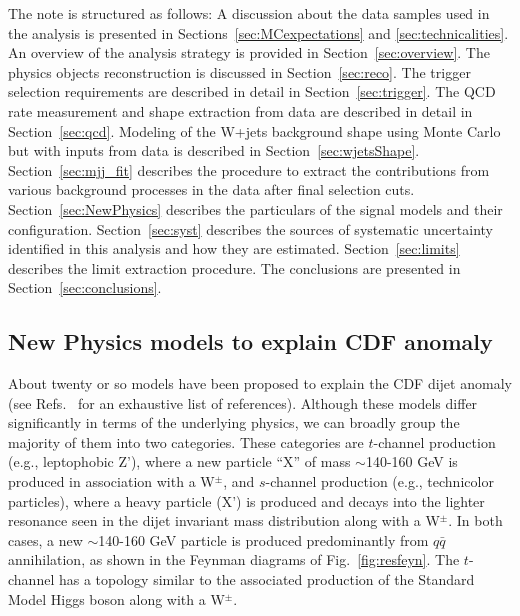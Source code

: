 \par
The note is structured as follows:
A discussion about the data samples used in the analysis is
presented in Sections~\ref{sec:MCexpectations} and \ref{sec:technicalities}.  
An overview of the analysis strategy is provided in Section~\ref{sec:overview}.
The physics objects reconstruction is discussed in Section~\ref{sec:reco}.
The trigger selection requirements are described in detail 
in Section~\ref{sec:trigger}.
The QCD rate measurement and shape extraction from data are 
described in detail in Section~\ref{sec:qcd}.
Modeling of the W+jets background shape using Monte Carlo 
but with inputs from data is described in Section~\ref{sec:wjetsShape}.
Section~\ref{sec:mjj_fit} describes the procedure to extract 
the contributions from various background processes in the data 
after final selection cuts.
Section~\ref{sec:NewPhysics} describes the particulars of the signal
models and their configuration.
Section~\ref{sec:syst} describes the sources of systematic uncertainty
identified in this analysis and how they are estimated.
Section~\ref{sec:limits} describes the limit extraction procedure.
The conclusions are presented in Section~\ref{sec:conclusions}.
\subsection{New Physics models to explain CDF anomaly}
\label{sec:models}
About twenty or so models have been proposed to  
explain the CDF dijet anomaly (see
Refs.~\cite{BuckleyHooperMartin} for an exhaustive list of references). 
Although these models differ significantly in terms of the 
underlying physics, we can broadly group the majority of them into two categories.
These categories are $t$-channel production (e.g., leptophobic Z'), 
where a new particle ``X'' of mass $\sim$140-160 GeV is produced in 
association with a W$^\pm$, and $s$-channel production 
(e.g., technicolor particles), where a 
heavy particle (X') is produced and decays into the lighter resonance 
seen in the dijet invariant mass distribution along with a W$^\pm$. 
In both cases, a new $\sim$140-160 GeV particle is produced 
predominantly from $q\bar{q}$ annihilation, as shown in the 
Feynman diagrams of Fig.~\ref{fig:resfeyn}.
The $t$-channel has a topology similar to the associated 
production of the Standard Model Higgs boson along with a W$^\pm$. 

